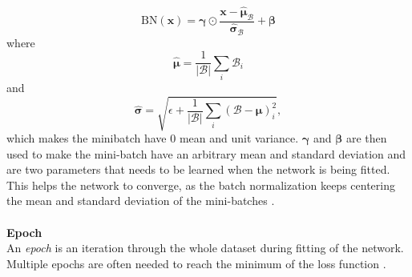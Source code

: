 \documentclass[./main.tex]{subfiles}
\begin{document}
$$\text{BN}(\bm{x}) = \bm{\gamma} \odot \frac{\bm{x} - \hat{\bm{\mu}}_{\mathcal{B}}}{\hat{\bm{\sigma}}_{\mathcal{B}}} + \bm{\beta}$$
where
$$\hat{\bm{\mu}} = \frac{1}{|\mathcal{B}|} \sum_{i} \mathcal{B}_i$$
and
$$\hat{\bm{\sigma}} = \sqrt{\epsilon + \frac{1}{|\mathcal{B}|} \sum_{i} \left(\mathcal{B} - \bm{\mu} \right)_i ^2 },$$
which makes the minibatch have $0$ mean and unit variance. $\bm{\gamma}$ and $\bm{\beta}$ are then used to make the mini-batch have an arbitrary mean and standard deviation and are two parameters that needs to be learned when the network is being fitted. This helps the network to converge, as the batch normalization keeps centering the mean and standard deviation of the mini-batches \cite{d2l}.
\\
\\
\textbf{Epoch} \\
An \textit{epoch} is an iteration through the whole dataset during fitting of the network. Multiple epochs are often needed to reach the minimum of the loss function \cite{d2l}.
\end{document}

